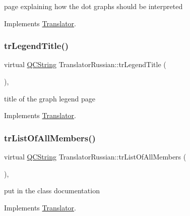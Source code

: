 page explaining how the dot graph\textquotesingle{}s should be interpreted 

Implements \mbox{\hyperlink{class_translator}{Translator}}.

\mbox{\label{class_translator_russian_a82fbfec6ffef42134f1ba1adb133b74a}} 
\subsubsection{\texorpdfstring{trLegendTitle()}{trLegendTitle()}}
{\footnotesize\ttfamily virtual \mbox{\hyperlink{class_q_c_string}{Q\+C\+String}} Translator\+Russian\+::tr\+Legend\+Title (\begin{DoxyParamCaption}{ }\end{DoxyParamCaption})\hspace{0.3cm}{\ttfamily [inline]}, {\ttfamily [virtual]}}

title of the graph legend page 

Implements \mbox{\hyperlink{class_translator}{Translator}}.

\mbox{\label{class_translator_russian_ac5b28bf36deed90f9a5b910ef83e99ba}} 
\subsubsection{\texorpdfstring{trListOfAllMembers()}{trListOfAllMembers()}}
{\footnotesize\ttfamily virtual \mbox{\hyperlink{class_q_c_string}{Q\+C\+String}} Translator\+Russian\+::tr\+List\+Of\+All\+Members (\begin{DoxyParamCaption}{ }\end{DoxyParamCaption})\hspace{0.3cm}{\ttfamily [inline]}, {\ttfamily [virtual]}}

put in the class documentation 

Implements \mbox{\hyperlink{class_translator}{Translator}}.

\mbox{\label{class_translator_russian_af6e3877f9f58d9439a706ebe35b54dd2}} 

